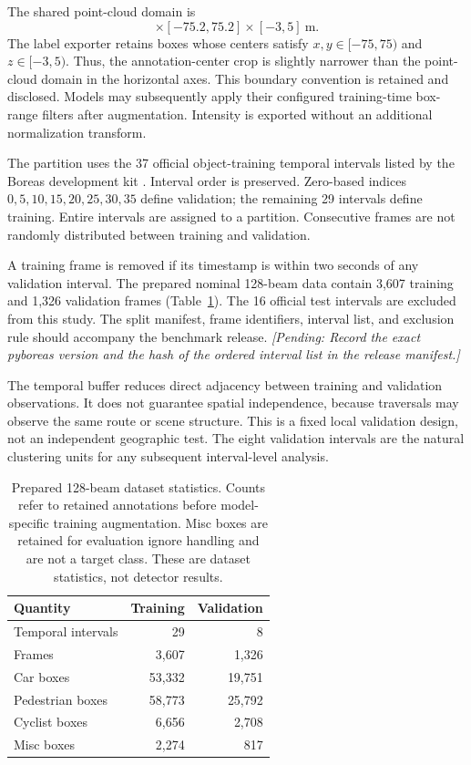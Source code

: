 \documentclass[10pt,twocolumn]{article}
\newcommand{\pending}[1]{\textcolor{blue!55!black}{\textit{[Pending: #1]}}}
\begin{document}
The shared point-cloud domain is
\begin{equation}
[-75.2,75.2]\times[-75.2,75.2]\times[-3,5]\ \mathrm{m}.
\label{eq:domain}
\end{equation}
The label exporter retains boxes whose centers satisfy $x,y\in[-75,75)$ and $z\in[-3,5)$. Thus, the annotation-center crop is slightly narrower than the point-cloud domain in the horizontal axes. This boundary convention is retained and disclosed. Models may subsequently apply their configured training-time box-range filters after augmentation. Intensity is exported without an additional normalization transform.


The partition uses the 37 official object-training temporal intervals listed by the Boreas development kit \cite{pyboreas}. Interval order is preserved. Zero-based indices $0,5,10,15,20,25,30,35$ define validation; the remaining 29 intervals define training. Entire intervals are assigned to a partition. Consecutive frames are not randomly distributed between training and validation.

A training frame is removed if its timestamp is within two seconds of any validation interval. The prepared nominal 128-beam data contain 3,607 training and 1,326 validation frames (Table~\ref{tab:data}). The 16 official test intervals are excluded from this study. The split manifest, frame identifiers, interval list, and exclusion rule should accompany the benchmark release. \pending{Record the exact pyboreas version and the hash of the ordered interval list in the release manifest.}

The temporal buffer reduces direct adjacency between training and validation observations. It does not guarantee spatial independence, because traversals may observe the same route or scene structure. This is a fixed local validation design, not an independent geographic test. The eight validation intervals are the natural clustering units for any subsequent interval-level analysis.

\begin{table}[!tbp]
\centering\small
\caption{Prepared 128-beam dataset statistics. Counts refer to retained annotations before model-specific training augmentation. Misc boxes are retained for evaluation ignore handling and are not a target class. These are dataset statistics, not detector results.}
\label{tab:data}
\begin{tabular}{lrr}
\toprule
Quantity & Training & Validation\\
\midrule
Temporal intervals & 29 & 8\\
Frames & 3,607 & 1,326\\
Car boxes & 53,332 & 19,751\\
Pedestrian boxes & 58,773 & 25,792\\
Cyclist boxes & 6,656 & 2,708\\
Misc boxes & 2,274 & 817\\
\bottomrule
\end{tabular}
\end{table}
\end{document}
